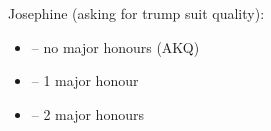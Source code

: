 Josephine  (asking for trump suit quality):
\begin{itemize}
  \item {} -- no major honours (AKQ)
  \item {} -- 1 major honour
  \item {} -- 2 major honours
\end{itemize}
